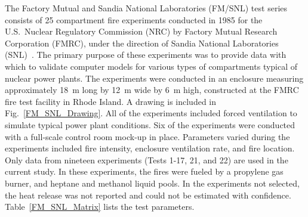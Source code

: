 The Factory Mutual and Sandia National Laboratories (FM/SNL) test series consists of 25 compartment fire experiments conducted in 1985 for the U.S.~Nuclear Regulatory Commission (NRC) by Factory Mutual Research Corporation (FMRC), under the direction of Sandia National Laboratories (SNL)~\cite{Nowlen:NUREG4681,Nowlen:NUREG4527}. The primary purpose of these experiments was to provide data with which to validate computer models for various types of compartments typical of nuclear power plants. The experiments were conducted in an enclosure measuring approximately 18~m long by 12~m wide by 6~m high, constructed at the FMRC fire test facility in Rhode Island. A drawing is included in Fig.~\ref{FM_SNL_Drawing}. All of the experiments included forced ventilation to simulate typical power plant conditions. Six of the experiments were conducted with a full-scale control room mock-up in place. Parameters varied during the experiments included fire intensity, enclosure ventilation rate, and fire location. Only data from nineteen experiments (Tests 1-17, 21, and 22) are used in the current study. In these experiments, the fires were fueled by a propylene gas burner, and heptane and methanol liquid pools. In the experiments not selected, the heat release was not reported and could not be estimated with confidence. Table~\ref{FM_SNL_Matrix} lists the test parameters.


